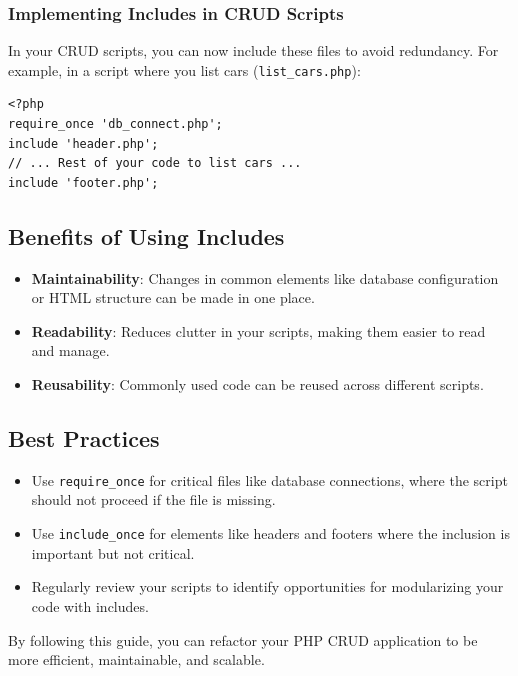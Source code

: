 \documentclass[11pt]{article}
\begin{document}
\subsubsection{Implementing Includes in CRUD Scripts}
\label{sec:org6d22398}
In your CRUD scripts, you can now include these files to avoid
redundancy. For example, in a script where you list cars
(\texttt{list\_cars.php}):

\begin{verbatim}
<?php
require_once 'db_connect.php';
include 'header.php';
// ... Rest of your code to list cars ...
include 'footer.php';
\end{verbatim}

\subsection{Benefits of Using Includes}
\label{sec:orgc253c7f}
\begin{itemize}
\item \textbf{Maintainability}: Changes in common elements like database
configuration or HTML structure can be made in one place.
\item \textbf{Readability}: Reduces clutter in your scripts, making them easier to
read and manage.
\item \textbf{Reusability}: Commonly used code can be reused across different
scripts.
\end{itemize}

\subsection{Best Practices}
\label{sec:org8ec8af9}
\begin{itemize}
\item Use \texttt{require\_once} for critical files like database connections, where
the script should not proceed if the file is missing.
\item Use \texttt{include\_once} for elements like headers and footers where the
inclusion is important but not critical.
\item Regularly review your scripts to identify opportunities for
modularizing your code with includes.
\end{itemize}

By following this guide, you can refactor your PHP CRUD application to
be more efficient, maintainable, and scalable.
\end{document}
